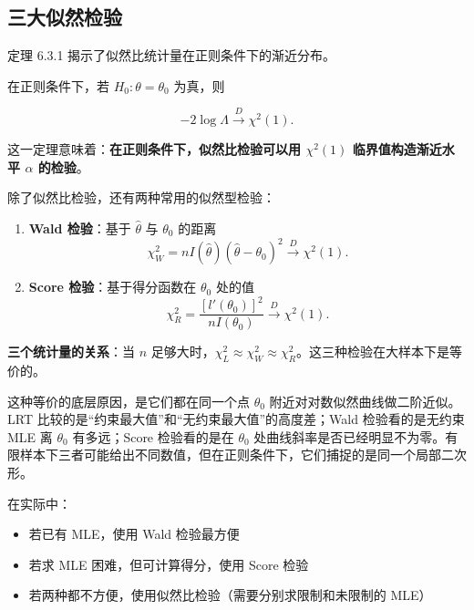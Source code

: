 \subsection{三大似然检验}

定理 6.3.1 揭示了似然比统计量在正则条件下的渐近分布。

\begin{theorem}[似然比检验的渐近分布]\label{th:lrt-asymptotic}
在正则条件下，若 $H_0: \theta = \theta_0$ 为真，则

\[
-2\log\Lambda \xrightarrow{D} \chi^2(1).
\label{eq:lrt-asymptotic}
\]
\end{theorem}

这一定理意味着：\textbf{在正则条件下，似然比检验可以用 $\chi^2(1)$ 临界值构造渐近水平 $\alpha$ 的检验}。

除了似然比检验，还有两种常用的似然型检验：

\begin{enumerate}
\item \textbf{Wald 检验}：基于 $\widehat{\theta}$ 与 $\theta_0$ 的距离
\[
\chi_W^2 = n I(\widehat{\theta})(\widehat{\theta} - \theta_0)^2 \xrightarrow{D} \chi^2(1).
\label{eq:wald-statistic}
\]

\item \textbf{Score 检验}：基于得分函数在 $\theta_0$ 处的值
\[
\chi_R^2 = \frac{[l'(\theta_0)]^2}{n I(\theta_0)} \xrightarrow{D} \chi^2(1).
\label{eq:score-statistic}
\]
\end{enumerate}

\begin{remark}
\textbf{三个统计量的关系}：当 $n$ 足够大时，$\chi_L^2 \approx \chi_W^2 \approx \chi_R^2$。这三种检验在大样本下是等价的。

这种等价的底层原因，是它们都在同一个点 $\theta_0$ 附近对对数似然曲线做二阶近似。LRT 比较的是``约束最大值''和``无约束最大值''的高度差；Wald 检验看的是无约束 MLE 离 $\theta_0$ 有多远；Score 检验看的是在 $\theta_0$ 处曲线斜率是否已经明显不为零。有限样本下三者可能给出不同数值，但在正则条件下，它们捕捉的是同一个局部二次形。

在实际中：
\begin{itemize}
\item 若已有 MLE，使用 Wald 检验最方便
\item 若求 MLE 困难，但可计算得分，使用 Score 检验
\item 若两种都不方便，使用似然比检验（需要分别求限制和未限制的 MLE）
\end{itemize}
\end{remark}

